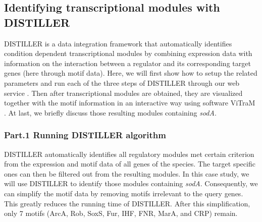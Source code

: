 \subsection{Identifying transcriptional modules with DISTILLER}

DISTILLER \cite{Lemmens2009} is a data integration framework that
automatically identifies condition dependent transcriptional modules by
combining expression data with information on the interaction between a
regulator and its corresponding target genes (here through motif data). Here,
we will first show how to setup the related parameters and run each of the
three steps of DISTILLER through our web service \cite{DISTILLER}.
%
Then after transcriptional modules are obtained,
%
they are visualized together with the motif information in an interactive way
using software ViTraM \cite{Sun2009}.
%
At last, we briefly discuss those resulting modules containing \textit{sodA}.

\subsubsection{Part.1 Running DISTILLER algorithm}\label{sec:dist-distmodule}

DISTILLER automatically identifies all regulatory modules met certain
criterion from the expression and motif data of all genes of the species.
%
The target specific ones can then be filtered out from the resulting modules.
%
In this case study, we will use DISTILLER to identify those modules containing
\textit{sodA}.
%
Consequently, we can simplify the motif data by removing motifs irrelevant to
the query genes.  This greatly reduces the running time of DISTILLER.  After
this simplification, only 7 motifs (ArcA, Rob, SoxS, Fur, IHF, FNR, MarA, and
CRP) remain.





